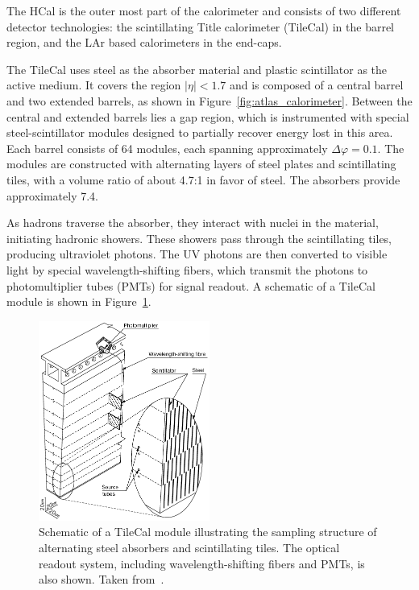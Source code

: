 The HCal is the outer most part of the calorimeter and consists of two different detector technologies: the scintillating Title calorimeter (TileCal) in the barrel region, and the LAr based calorimeters in the end-caps\@.

The TileCal uses steel as the absorber material and plastic scintillator as the active medium. It covers the region $|\eta| < 1.7$ and is composed of a central barrel and two extended barrels, as shown in Figure~\ref{fig:atlas_calorimeter}. Between the central and extended barrels lies a gap region, which is instrumented with special steel-scintillator modules designed to partially recover energy lost in this area. Each barrel consists of 64 modules, each spanning approximately $\Delta\varphi = 0.1$. The modules are constructed with alternating layers of steel plates and scintillating tiles, with a volume ratio of about 4.7:1 in favor of steel. The absorbers provide approximately 7.4\intlength{}.

As hadrons traverse the absorber, they interact with nuclei in the material, initiating hadronic showers. These showers pass through the scintillating tiles, producing ultraviolet photons. The UV photons are then converted to visible light by special wavelength-shifting fibers, which transmit the photons to photomultiplier tubes (PMTs) for signal readout. A schematic of a TileCal module is shown in Figure~\ref{fig:atlas_hcal_module}.

\begin{figure}[htp]
    \centering
    \includegraphics[width=0.5\textwidth]{figures/atlas/atlas_hcal_module.png}
    \caption{Schematic of a TileCal module illustrating the sampling structure of alternating steel absorbers and scintillating tiles. The optical readout system, including wavelength-shifting fibers and PMTs, is also shown. Taken from~\cite{atlas_collaboration_paper}.}\label{fig:atlas_hcal_module}
\end{figure}


